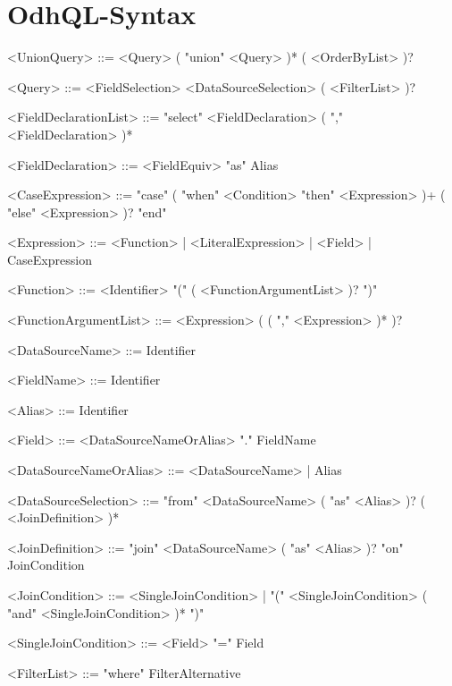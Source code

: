 \chapter{OdhQL-Syntax}\label{app:odhql-syntax}



\begin{grammar}
\small
    <UnionQuery> ::= <Query> ( "union" <Query> )* ( <OrderByList> )?

    <Query> ::= <FieldSelection>  <DataSourceSelection> ( <FilterList> )?

    <FieldDeclarationList> ::= "select" <FieldDeclaration> ( "," <FieldDeclaration> )*

    <FieldDeclaration> ::= <FieldEquiv> "as" Alias

    <CaseExpression> ::= "case" ( "when" <Condition> "then" <Expression> )+  ( "else" <Expression> )? "end"

    <Expression> ::= <Function> | <LiteralExpression> | <Field> | CaseExpression

    <Function> ::= <Identifier> "(" ( <FunctionArgumentList> )? ")"

    <FunctionArgumentList> ::= <Expression> ( ( "," <Expression> )* )?

    <DataSourceName> ::= Identifier

    <FieldName> ::= Identifier

    <Alias> ::= Identifier

    <Field> ::= <DataSourceNameOrAlias> "." FieldName

    <DataSourceNameOrAlias> ::= <DataSourceName> | Alias

    <DataSourceSelection> ::= "from" <DataSourceName> ( "as" <Alias> )? ( <JoinDefinition> )*

    <JoinDefinition> ::= "join" <DataSourceName> ( "as" <Alias> )? "on" JoinCondition

    <JoinCondition> ::= <SingleJoinCondition> | "(" <SingleJoinCondition> ( "and" <SingleJoinCondition> )* ")"

    <SingleJoinCondition> ::= <Field> "=" Field

    <FilterList> ::= "where" FilterAlternative


\end{grammar}
